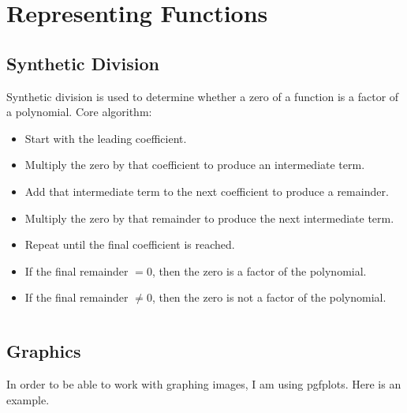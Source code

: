 \section{Representing Functions}

\subsection{Synthetic Division}
    Synthetic division is used to determine whether a zero of a function
    is a factor of a polynomial.
    Core algorithm:
    \begin{itemize}
        \item Start with the leading coefficient.
        \item Multiply the zero by that coefficient to produce an intermediate term. 
        \item Add that intermediate term to the next coefficient to produce a remainder.
        \item Multiply the zero by that remainder to produce the next intermediate term.
        \item Repeat until the final coefficient is reached.
        \item If the final remainder $= 0$, then the zero is a factor of the polynomial.
        \item If the final remainder $\neq 0$, then the zero is not a factor of the polynomial.
    \end{itemize}
    \newpage
    \inputminted[linenos, breaklines]{python}{001/synthetic_division.py}
    \newpage

\subsection{Graphics}
    In order to be able to work with graphing images, I am using pgfplots. Here is an example.


    
